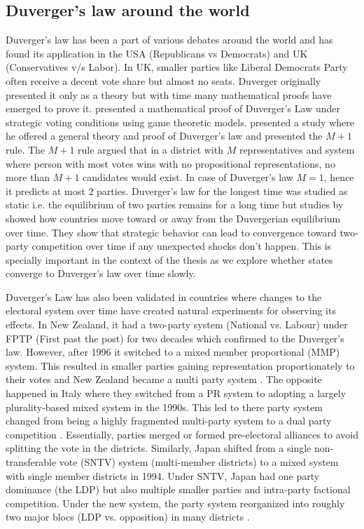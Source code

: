 \begin{sloppypar}
\subsection{Duverger's law around the world}
Duverger's law has been a part of various debates around the world and has found its application in the USA (Republicans vs Democrats) and UK (Conservatives v/s Labor). In UK, smaller parties like Liberal Democrats Party often receive a decent vote share but almost no seats. Duverger originally presented it only as a theory but with time many mathematical proofs have emerged to prove it. \cite{palfrey1989mathematical} presented a mathematical proof of Duverger’s Law under strategic voting conditions using game theoretic models. \cite{cox1997making} presented a study where he offered a general theory and proof of Duverger's law and presented the $M+1$ rule. The $M+1$ rule argued that in a district with $M$ representatives and system where person with most votes wins with no propositional representations, no more than $M+1$ candidates would exist. In case of Duverger's law $M=1$, hence it predicts at most $2$ parties. Duverger's law for the longest time was studied as static i.e. the equilibrium of two parties  remains for a long time but studies by \cite{forand2015dynamic} showed how  countries move toward or away from the Duvergerian equilibrium over time.  They show that strategic behavior can lead to convergence toward two-party competition over time if any unexpected shocks don't happen. This is specially important in the context of the thesis as we explore whether states converge to Duverger's law over time slowly. 

\vspace{0.3cm}

Duverger's Law has also been validated in countries where changes to the electoral system over time have created natural experiments for observing its effects. In New Zealand, it had a two-party system (National vs. Labour) under FPTP (First past the post) for two decades which confirmed to the Duverger’s law. However, after 1996 it switched to a mixed member proportional (MMP) system. This resulted in smaller parties gaining representation proportionately to their votes and New Zealand became a multi party system \citep{Eberhard_2017,dunleavy2008duverger}. The opposite happened in Italy where they switched from a PR system to  adopting a largely plurality-based mixed system in the 1990s. This led to there party system changed from being a highly fragmented multi-party system to a dual party competition \citep{reed2001duverger,d2012extending}. Essentially, parties merged or formed pre-electoral alliances to avoid splitting the vote in the districts. Similarly,  Japan shifted from a single non-transferable vote (SNTV) system (multi-member districts) to a mixed system with single member districts in 1994. Under SNTV, Japan had one party dominance (the LDP) but also multiple smaller parties and intra-party factional competition. Under the new system, the party system reorganized into roughly two major blocs (LDP vs. opposition) in many districts \citep{reed2007duverger}. 


\end{sloppypar}
